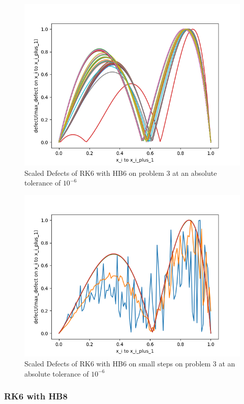 \documentclass{article}
\begin{document}
\begin{figure}[H]
\centering
\includegraphics[width=0.7\linewidth]{./figures/rk6_with_hb6_p3_scaled_defects}
\caption{Scaled Defects of RK6 with HB6 on problem 3 at an absolute tolerance of $10^{-6}$}
\label{fig:rk6_with_hb6_p3_scaled_defects}
\end{figure}

\begin{figure}[H]
\centering
\includegraphics[width=0.7\linewidth]{./figures/rk6_with_hb6_p3_scaled_defects_small_steps}
\caption{Scaled Defects of RK6 with HB6 on small steps on problem 3 at an absolute tolerance of $10^{-6}$}
\label{fig:rk6_with_hb6_p3_scaled_defects_small_steps}
\end{figure}

\subsubsection{RK6 with HB8}
\end{document}
